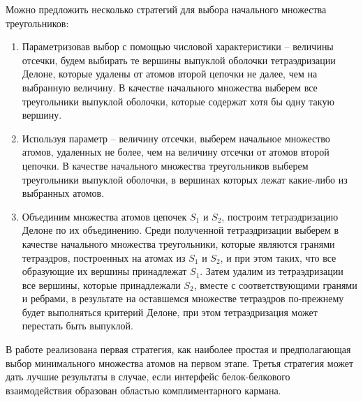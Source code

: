 Можно предложить несколько стратегий для выбора начального множества треугольников:
\begin{enumerate}
\item Параметризовав выбор с помощью числовой характеристики -- величины отсечки, будем выбирать те вершины выпуклой оболочки тетраэдризации Делоне, которые удалены от атомов второй цепочки не далее, чем на выбранную величину. В качестве начального множества выберем все треугольники выпуклой оболочки, которые содержат хотя бы одну такую вершину.
\item Используя параметр -- величину отсечки, выберем начальное множество атомов, удаленных не более, чем на величину отсечки от атомов второй цепочки. В качестве начального множества треугольников выберем треугольники выпуклой оболочки, в вершинах которых лежат какие-либо из выбранных атомов.  
\item Объединим множества атомов цепочек $S_1$ и $S_2$, построим тетраэдризацию Делоне по их объединению. Среди полученной тетраэдризации выберем в качестве начального множества треугольники, которые являются гранями тетраэдров, построенных на атомах из $S_1$ и $S_2$, и при этом таких, что все образующие их вершины принадлежат $S_1$. Затем удалим из тетраэдризации все вершины, которые принадлежали $S_2$, вместе с соответствующими гранями и ребрами, в результате на оставшемся множестве тетраэдров по-прежнему будет выполняться критерий Делоне, при этом тетраэдризация может перестать быть выпуклой.
\end{enumerate} 

В работе реализована первая стратегия, как наиболее простая и предполагающая выбор минимального множества атомов на первом этапе. Третья стратегия может дать лучшие результаты в случае, если интерфейс белок-белкового взаимодействия образован областью комплиментарного кармана. 



